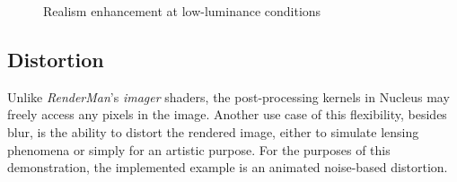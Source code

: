 \begin{figure}[h!]
  \centering
  \caption[Scotopic vision]{Realism enhancement at low-luminance conditions}
  \label{fig:postProcAcuityComparison}
\end{figure}

\subsection{Distortion}

Unlike \emph{RenderMan}'s \emph{imager} shaders, the post-processing kernels in Nucleus may freely access any pixels in the image. Another use case of this flexibility, besides blur, is the ability to distort the rendered image, either to simulate lensing phenomena or simply for an artistic purpose. For the purposes of this demonstration, the implemented example is an animated noise-based distortion.

